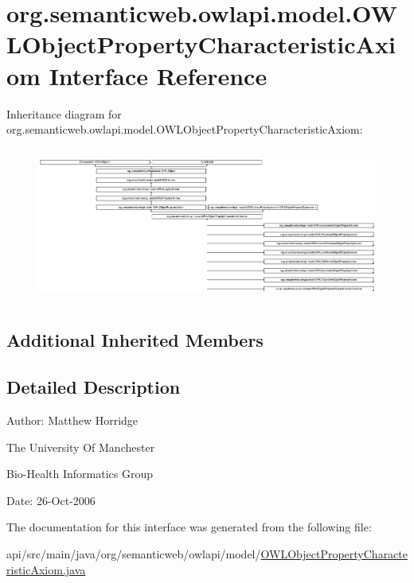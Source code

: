 \hypertarget{interfaceorg_1_1semanticweb_1_1owlapi_1_1model_1_1_o_w_l_object_property_characteristic_axiom}{\section{org.\-semanticweb.\-owlapi.\-model.\-O\-W\-L\-Object\-Property\-Characteristic\-Axiom Interface Reference}
\label{interfaceorg_1_1semanticweb_1_1owlapi_1_1model_1_1_o_w_l_object_property_characteristic_axiom}
}
Inheritance diagram for org.\-semanticweb.\-owlapi.\-model.\-O\-W\-L\-Object\-Property\-Characteristic\-Axiom\-:\begin{figure}[H]
\begin{center}
\leavevmode
\includegraphics[height=5.100183cm]{interfaceorg_1_1semanticweb_1_1owlapi_1_1model_1_1_o_w_l_object_property_characteristic_axiom}
\end{center}
\end{figure}
\subsection*{Additional Inherited Members}


\subsection{Detailed Description}
Author\-: Matthew Horridge\par
 The University Of Manchester\par
 Bio-\/\-Health Informatics Group\par
 Date\-: 26-\/\-Oct-\/2006\par
\par
 

The documentation for this interface was generated from the following file\-:\begin{DoxyCompactItemize}
\item 
api/src/main/java/org/semanticweb/owlapi/model/\hyperlink{_o_w_l_object_property_characteristic_axiom_8java}{O\-W\-L\-Object\-Property\-Characteristic\-Axiom.\-java}\end{DoxyCompactItemize}
